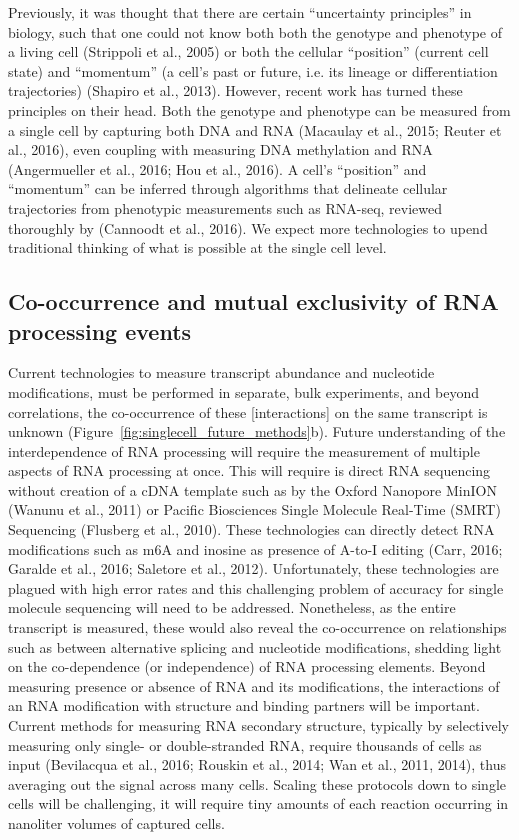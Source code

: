 Previously, it was thought that there are certain ``uncertainty principles'' in biology, such that one could not know both both the genotype and phenotype of a living cell (Strippoli et al., 2005) or both the cellular ``position'' (current cell state) and ``momentum'' (a cell's past or future, i.e. its lineage or differentiation trajectories) (Shapiro et al., 2013). However, recent work has turned these principles on their head. Both the genotype and phenotype can be measured from a single cell by capturing both DNA and RNA (Macaulay et al., 2015; Reuter et al., 2016), even coupling with measuring DNA methylation and RNA (Angermueller et al., 2016; Hou et al., 2016). A cell's ``position'' and ``momentum'' can be inferred through algorithms that delineate cellular trajectories from phenotypic measurements such as RNA-seq, reviewed thoroughly by (Cannoodt et al., 2016). We expect more technologies to upend traditional thinking of what is possible at the single cell level.

\subsection{Co-occurrence and mutual exclusivity of RNA processing events}

Current technologies to measure transcript abundance and nucleotide modifications, must be performed in separate, bulk experiments, and beyond correlations, the co-occurrence of these [interactions] on the same transcript is unknown (Figure~\ref{fig:singlecell_future_methods}b). Future understanding of the interdependence of RNA processing will require the measurement of multiple aspects of RNA processing at once. This will require is direct RNA sequencing without creation of a cDNA template such as by the Oxford Nanopore MinION (Wanunu et al., 2011) or Pacific Biosciences Single Molecule Real-Time (SMRT) Sequencing (Flusberg et al., 2010). These technologies can directly detect RNA modifications such as m6A and inosine as presence of A-to-I editing (Carr, 2016; Garalde et al., 2016; Saletore et al., 2012). Unfortunately, these technologies are plagued with high error rates and this challenging problem of accuracy for single molecule sequencing will need to be addressed. Nonetheless, as the entire transcript is measured, these would also reveal the co-occurrence on relationships such as between alternative splicing and nucleotide modifications, shedding light on the co-dependence (or independence) of RNA processing elements.
Beyond measuring presence or absence of RNA and its modifications, the interactions of an RNA modification with structure and binding partners will be important. Current methods for measuring RNA secondary structure, typically by selectively measuring only single- or double-stranded RNA, require thousands of cells as input (Bevilacqua et al., 2016; Rouskin et al., 2014; Wan et al., 2011, 2014), thus averaging out the signal across many cells. Scaling these protocols down to single cells will be challenging, it will require tiny amounts of each reaction occurring in nanoliter volumes of captured cells.

